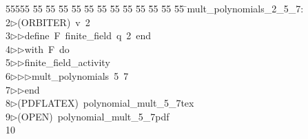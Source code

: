 %
%
\begin{tabbing}
55555 \= 55 \= 55 \= 55 \= 55 \= 55 \= 55 \= 55 \= 55 \= 55 \= 55 \= 55 \= 55 \= \>mult\_polynomials\_2\_5\_7:\\[0pt]
2\>$\triangleright$\>(ORBITER)\ v\ 2\ \\[0pt]
3\>$\triangleright$\>$\triangleright$\>define\ F\ finite\_field\ q\ 2\ end\ \\[0pt]
4\>$\triangleright$\>$\triangleright$\>with\ F\ do\ \\[0pt]
5\>$\triangleright$\>$\triangleright$\>finite\_field\_activity\ \\[0pt]
6\>$\triangleright$\>$\triangleright$\>$\triangleright$\>mult\_polynomials\ 5\ 7\ \\[0pt]
7\>$\triangleright$\>$\triangleright$\>end\\[0pt]
8\>$\triangleright$\>(PDFLATEX)\ polynomial\_mult\_5\_7tex\\[0pt]
9\>$\triangleright$\>(OPEN)\ polynomial\_mult\_5\_7pdf\\[0pt]
10\>\end{tabbing}
